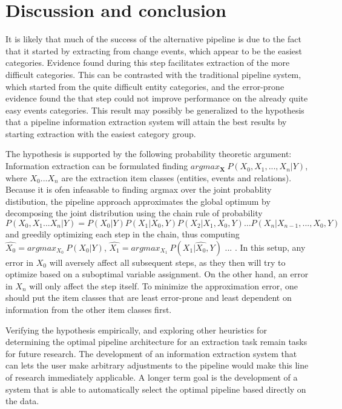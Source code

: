 \section{Discussion and conclusion}

It is likely that much of the success of the alternative pipeline is due to the fact that it started by extracting from change events, which appear to be the easiest categories. Evidence found during this step facilitates extraction of the more difficult categories. This can be contrasted with the traditional pipeline system, which started from the quite difficult entity categories, and the error-prone evidence found the that step could not improve performance on the already quite easy events categories. This result may possibly be generalized to the hypothesis that a pipeline information extraction system will attain the best results by starting extraction with the easiest category group.

The hypothesis is supported by the following probability theoretic argument: Information extraction can be formulated finding $argmax_{\boldsymbol{X}}\ P(X_0, X_1, ..., X_n | Y)$, where $X_0 ... X_n$ are the extraction item classes (entities, events and relations). Because it is ofen infeasable to finding argmax over the joint probablity distibution, the pipeline approach approximates the global optimum by decomposing the joint distribution using the chain rule of probability $P(X_0, X_1 ... X_n | Y) = P(X_0 | Y)P(X_1 | X_0, Y)P(X_2 | X_1, X_0, Y) \dots P(X_n | X_{n-1}, ..., X_0, Y)$ and greedily optimizing each step in the chain, thus computing $\hat{X_0} = argmax_{X_0}\ P(X_0 | Y)$, $\hat{X_1} = argmax_{X_1}\ P(X_1 | \hat{X_0}, Y)$ ... . In this setup, any error in $X_0$ will aversely affect all subsequent steps, as they then will try to optimize based on a suboptimal variable assignment. On the other hand, an error in $X_n$ will only affect the step itself. To minimize the approximation error, one should put the item classes that are least error-prone and least dependent on information from the other item classes first.

Verifying the hypothesis empirically, and exploring other heuristics for determining the optimal pipeline architecture for an extraction task remain tasks for future research. The development of an information extraction system that can lets the user make arbitrary adjustments to the pipeline would make this line of research immediately applicable. A longer term goal is the development of a system that is able to automatically select the optimal pipeline based directly on the data.

